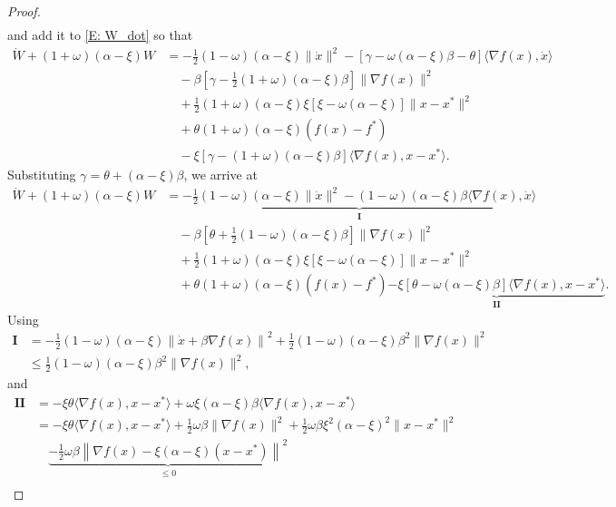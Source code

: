 \documentclass[pdflatex,sn-mathphys-num]{sn-jnl}
\theoremstyle{thmstyleone}
\theoremstyle{thmstyletwo}
\theoremstyle{thmstylethree}
\begin{document}
\begin{appendices}
\begin{proof}
\begin{align*}
\end{align*}
and add it to \eqref{E: W_dot} so that
\begin{align*}
 \dot{W} + (1+\omega)(\alpha-\xi)W 
&= -\frac{1}{2}(1-\omega)(\alpha-\xi)\|\dot{x}\|^2
   - [\gamma - \omega(\alpha-\xi)\beta - \theta]\langle \nabla f(x),\dot{x} \rangle \\
&\quad - \beta\left[ \gamma - \frac{1}{2}(1+\omega)(\alpha-\xi)\beta \right]\|\nabla f(x)\|^2 \\
&\quad + \frac{1}{2}(1+\omega)(\alpha-\xi)\xi[\xi-\omega(\alpha-\xi)]\|x-x^*\|^2 \\
&\quad + \theta(1+\omega)(\alpha-\xi)(f(x)-f^*) \\
&\quad - \xi[\gamma-(1+\omega)(\alpha-\xi)\beta]\langle\nabla f(x),x-x^* \rangle.
\end{align*}
Substituting $\gamma = \theta + (\alpha-\xi)\beta$, we arrive at
\begin{align*}
 \dot{W} + (1+\omega)(\alpha-\xi)W 
&= \underbrace{ -\frac{1}{2}(1-\omega)(\alpha-\xi)\|\dot{x}\|^2
   - (1-\omega)(\alpha-\xi)\beta \langle \nabla f(x),\dot{x} \rangle }_{\mathbf{I}} \\
&\quad - \beta\left[ \theta + \frac{1}{2}(1-\omega)(\alpha-\xi)\beta \right]\|\nabla f(x)\|^2 \\
&\quad + \frac{1}{2}(1+\omega)(\alpha-\xi)\xi[\xi-\omega(\alpha-\xi)]\|x-x^*\|^2 \\
&\quad + \theta(1+\omega)(\alpha-\xi)(f(x)-f^*)
  \underbrace{ - \xi[\theta-\omega(\alpha-\xi)\beta]\langle\nabla f(x),x-x^* \rangle }_{\mathbf{II}}.
\end{align*}
Using
\begin{align*}
\mathbf{I}
&= -\frac{1}{2}(1-\omega)(\alpha-\xi) \left\| \dot{x} + \beta\nabla f(x) \right\|^2
   + \frac{1}{2}(1-\omega)(\alpha-\xi)\beta^2 \| \nabla f(x) \|^2 \\
&\le \frac{1}{2}(1-\omega)(\alpha-\xi)\beta^2 \| \nabla f(x) \|^2,  
\end{align*}
and 
\begin{align*}
\mathbf{II}
&= - \xi\theta \langle\nabla f(x),x-x^* \rangle
   + \omega\xi(\alpha-\xi)\beta \langle\nabla f(x),x-x^* \rangle \\
&= - \xi\theta \langle\nabla f(x),x-x^* \rangle
   + \frac{1}{2}\omega\beta \| \nabla f(x) \|^2
   + \frac{1}{2}\omega\beta \xi^2(\alpha-\xi)^2 \| x-x^* \|^2 \\
&\quad \underbrace{ -\frac{1}{2}\omega\beta \left\| \nabla f(x) - \xi(\alpha-\xi)(x-x^*) \right\|^2 }_{\le 0} \\

\end{align*}
\end{proof}
\end{appendices}
\end{document}
